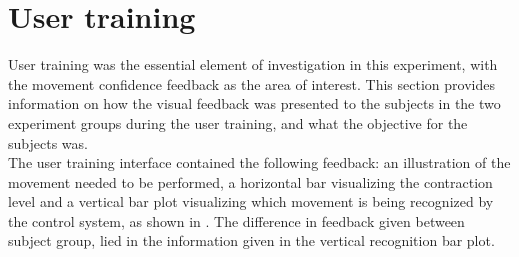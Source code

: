 
\section{User training} \label{sec:M:usertraining}
User training was the essential element of investigation in this experiment, with the movement confidence feedback as the area of interest. This section provides information on how the visual feedback was presented to the subjects in the two experiment groups during the user training, and what the objective for the subjects was. \\
The user training interface contained the following feedback: an illustration of the movement needed to be performed, a horizontal bar visualizing the contraction level and a vertical bar plot visualizing which movement is being recognized by the control system, as shown in . The difference in feedback given between subject group, lied in the information given in the vertical recognition bar plot.

